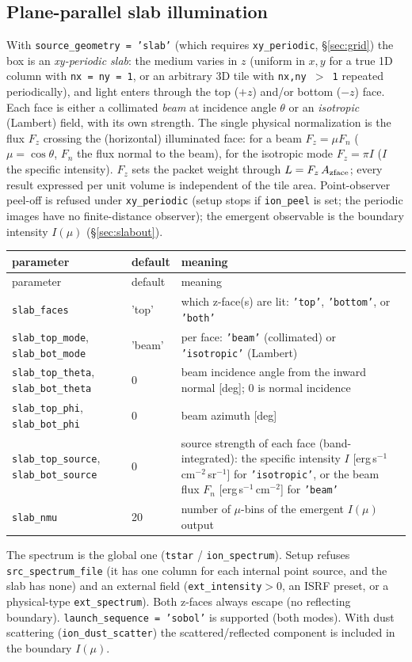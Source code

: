 \documentclass[english,a4paper]{my_memo}
\newcommand{\code}[1]{\texttt{#1}}
\begin{document}
\subsection{Plane-parallel slab illumination}
\label{sec:slab}
With \code{source\_geometry\,=\,'slab'} (which requires \code{xy\_periodic},
\S\ref{sec:grid}) the box is an \emph{xy-periodic slab}: the medium varies in
$z$ (uniform in $x,y$ for a true 1D column with \code{nx\,=\,ny\,=\,1}, or an
arbitrary 3D tile with \code{nx,ny\,$>$\,1} repeated periodically), and light
enters through the top ($+z$) and/or bottom ($-z$) face.  Each face is either a
collimated \emph{beam} at incidence angle $\theta$ or an \emph{isotropic}
(Lambert) field, with its own strength.  The single physical normalization is
the flux $F_z$ crossing the (horizontal) illuminated face: for a beam
$F_z=\mu F_n$ ($\mu=\cos\theta$, $F_n$ the flux normal to the beam), for the
isotropic mode $F_z=\pi I$ ($I$ the specific intensity).  $F_z$ sets the packet
weight through $L=F_z\,A_{\rm zface}$; every result expressed per unit volume is independent
of the tile area.  Point-observer peel-off is refused under \code{xy\_periodic}
(setup stops if \code{ion\_peel} is set; the periodic images have no finite-distance observer); the emergent observable
is the boundary intensity $I(\mu)$ (\S\ref{sec:slabout}).
{\small
\begin{longtable}{llp{7.2cm}}
\toprule
parameter & default & meaning \\
\midrule
\endfirsthead
\toprule
parameter & default & meaning \\
\midrule
\endhead
\bottomrule
\endlastfoot
\code{slab\_faces} & 'top' & which z-face(s) are lit: \code{'top'}, \code{'bottom'}, or \code{'both'} \\
\code{slab\_top\_mode}, \code{slab\_bot\_mode} & 'beam' & per face: \code{'beam'} (collimated) or \code{'isotropic'} (Lambert) \\
\code{slab\_top\_theta}, \code{slab\_bot\_theta} & 0 & beam incidence angle from the inward normal [deg]; 0 is normal incidence \\
\code{slab\_top\_phi}, \code{slab\_bot\_phi} & 0 & beam azimuth [deg] \\
\code{slab\_top\_source}, \code{slab\_bot\_source} & 0 & source strength of each face (band-integrated): the specific intensity $I$ [erg\,s$^{-1}$\,cm$^{-2}$\,sr$^{-1}$] for \code{'isotropic'}, or the beam flux $F_n$ [erg\,s$^{-1}$\,cm$^{-2}$] for \code{'beam'} \\
\code{slab\_nmu} & 20 & number of $\mu$-bins of the emergent $I(\mu)$ output \\
\end{longtable}
}
\noindent The spectrum is the global one (\code{tstar} / \code{ion\_spectrum}).
Setup refuses \code{src\_spectrum\_file} (it has one column for each
internal point source, and the slab has none) and an external field
(\code{ext\_intensity}$>0$, an ISRF preset, or a physical-type
\code{ext\_spectrum}).
Both z-faces always escape (no reflecting boundary).  \code{launch\_sequence\,=\,'sobol'}
is supported (both modes).  With dust scattering (\code{ion\_dust\_scatter}) the
scattered/reflected component is included in the boundary $I(\mu)$.
\end{document}
